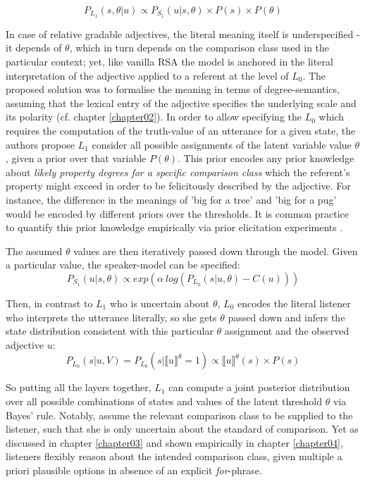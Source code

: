 $$P_{L_1} (s, \theta | u) \propto P_{S_1} (u | s, \theta) \times P (s) \times P(\theta)$$ 

In case of relative gradable adjectives, the literal meaning itself is underspecified - it depends of $\theta$, which in turn depends on the comparison class used in the particular context; yet, like vanilla RSA the model is anchored in the literal interpretation of the adjective applied to a referent at the level of $L_0$. The proposed solution was to formalise the meaning in terms of degree-semantics, assuming that the lexical entry of the adjective specifies the underlying scale and its polarity (cf. chapter \ref{chapter02}). 
In order to allow specifying the $L_0$ which requires the computation of the truth-value of an utterance for a given state, the authors propose $L_1$ consider all possible assignments of the latent variable value $\theta$, given a prior over that variable $P(\theta)$. This prior encodes any prior knowledge about \emph{likely property degrees for a specific comparison class} which the referent's property might exceed in order to be felicitously described by the adjective. For instance, the difference in the meanings of 'big for a tree' and 'big for a pug' would be encoded by different  priors over the thresholds. It is common practice to quantify this prior knowledge empirically via prior elicitation experiments \parencite{problang}.

The assumed $\theta$ values are then iteratively passed down through the model. Given a particular value, the speaker-model can be specified:
$$P_{S_1} (u | s, \theta) \propto exp(\alpha \: log (P_{L_0} (s | u, \theta) - C(u)) )$$

Then, in contrast to $L_1$ who is uncertain about $\theta$, $L_0$ encodes the literal listener who interprets the utterance literally, so she gets $\theta$ passed down and infers the state distribution consistent with this particular $\theta$ assignment and the observed adjective $u$:
$$P_{L_0} (s | u, V) = P_{L_0} (s | \llbracket u \rrbracket ^\theta = 1 ) \propto \llbracket u \rrbracket ^\theta (s) \times P(s)$$

So putting all the layers together, $L_1$ can compute a joint posterior distribution over all possible combinations of states and values of the latent threshold $\theta$ via Bayes' rule. Notably, \textcite{lassiter2013context} assume the relevant comparison class to be supplied to the listener, such that she is only uncertain about the standard of comparison. Yet as discussed in chapter \ref{chapter03} and shown empirically in chapter \ref{chapter04}, listeners flexibly reason about the intended comparison class, given multiple a priori plausible options in absence of an explicit \emph{for}-phrase.

